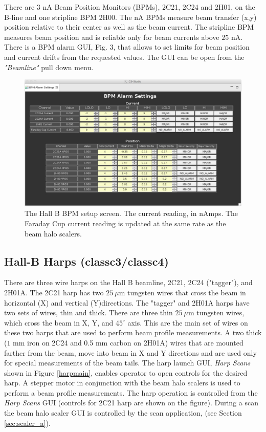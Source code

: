 \documentclass[12pt]{article}
\begin{document}
There are 3 nA Beam Position Monitors (BPMs), 2C21, 2C24 and 2H01, on the B-line and one stripline BPM 2H00. The nA BPMs measure beam transfer (x,y) position relative to their center as well as the beam current. The stripline BPM measures beam position and is reliable only for beam currents above $25$ nA. There is a BPM alarm GUI, Fig. 3,
that allows to set limits for beam position and current drifts from the requested values. The GUI can be open from the \emph{"Beamline"} pull down menu.
\begin{figure}[tbhp]
{\centering \includegraphics[scale=0.5, angle=90]{bpms.pdf} \par}
\caption{The Hall B BPM setup screen. The current reading, in nAmps. The Faraday Cup current
reading is updated at the same rate as the beam halo scalers. \label{fig:bpm}}
\end{figure}

\subsection{Hall-B Harps (classc3/classc4)\label{sec:harp}}
\indent

There are three wire harps on the Hall B beamline, 2C21, 2C24 ("tagger"), and 2H01A. The 2C21 harp has two $25~\mu$m tungsten wires that cross the beam in horizontal (X) and vertical (Y)directions. The "tagger" and 2H01A harps have two sets of wires, thin and thick. There are three thin $25~\mu$m tungsten wires, which cross the beam in X, Y, and $45^\circ$ axis. This are the main set of wires on these two harps that are used to perform beam profile measurements. A two thick ($1$ mm iron on 2C24 and 0.5 mm carbon on 2H01A) wires that are mounted farther from the beam, move into beam in X and Y directions and are used only for special measurements of the beam tails. The harp launch GUI, {\it Harp Scans} shown in Figure \ref{harpmain}, enables operator to open controls for the desired harp. A stepper motor in conjunction
with the beam halo scalers is used to perform a beam profile measurements. The harp operation is controlled from the {\it Harp Scans} GUI (controls for 2C21 harp are shown on the figure). During a scan the beam halo scaler GUI is controlled by the scan application,  (see Section \ref{sec:scaler_a}).
\end{document}
